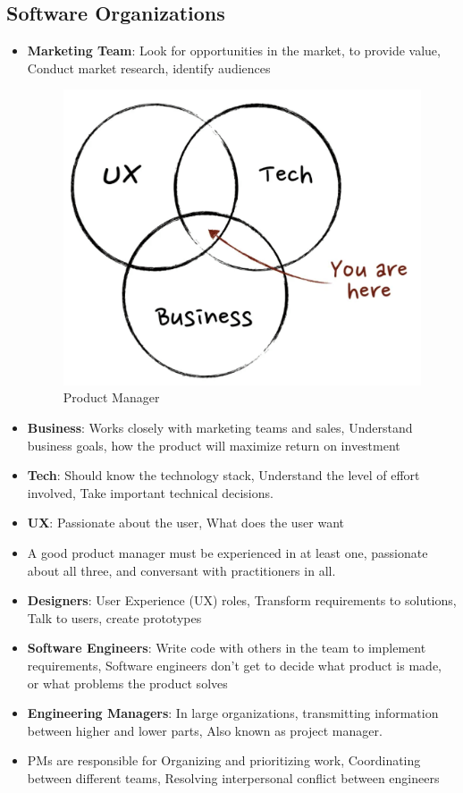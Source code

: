 \documentclass[a4paper]{article}
\begin{document}
\subsection{Software Organizations}
\begin{itemize}
    \item \textbf{Marketing Team}: Look for opportunities in the market, to provide value, Conduct market research, identify audiences
    \begin{figure}[H]
        \centering
        \includegraphics[width=0.5\linewidth]{Degree//static/SE_PM_stuff.png}
        \caption{Product Manager}
    \end{figure}
    \item \textbf{Business}: Works closely with marketing teams and sales, Understand business goals, how the product will maximize return on investment
    \item \textbf{Tech}: Should know the technology stack, Understand the level of effort involved, Take important technical decisions.
    \item \textbf{UX}: Passionate about the user, What does the user want
    \item A good product manager must be experienced in at least one, passionate about all three, and conversant with practitioners in all.
    \item \textbf{Designers}: User Experience (UX) roles, Transform requirements to solutions, Talk to users, create prototypes
    \item \textbf{Software Engineers}: Write code with others in the team to implement requirements, Software engineers don’t get to decide what product is made, or what problems the product solves
    \item \textbf{Engineering Managers}: In large organizations, transmitting information between higher and lower parts, Also known as project manager.
    \item PMs are responsible for Organizing and prioritizing work, Coordinating between different teams, Resolving interpersonal conflict between engineers

\end{itemize}
\end{document}
